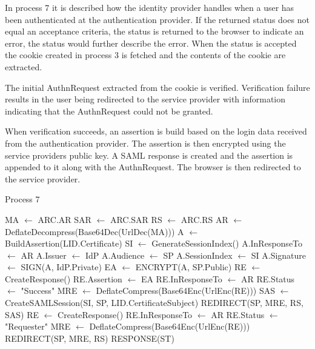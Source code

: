 \documentclass[twosided]{report}
\begin{document}
In process 7 it is described how the identity provider handles when a user has been authenticated at the authentication provider. If the returned status does not equal an acceptance criteria, the status is returned to the browser to indicate an error, the status would further describe the error. When the status is accepted the cookie created in process 3 is fetched and the contents of the cookie are extracted.
\par
The initial AuthnRequest extracted from the cookie is verified. Verification failure results in the user being redirected to the service provider with information indicating that the AuthnRequest could not be granted.
\par
When verification succeeds, an assertion is build based on the login data received from the authentication provider. The assertion is then encrypted using the service providers public key. A SAML response is created and the assertion is appended to it along with the AuthnRequest. The browser is then redirected to the service provider.
\begin{algorithm}[H]
	\caption{Process 7}
	\begin{algorithmic}
			\STATE MA $\leftarrow$ ARC.AR
			\STATE SAR $\leftarrow$ ARC.SAR
			\STATE RS $\leftarrow$ ARC.RS
			\STATE AR $\leftarrow$ DeflateDecompress(Base64Dec(UrlDec(MA)))
				\STATE A $\leftarrow$ BuildAssertion(LID.Certificate)
				\STATE SI $\leftarrow$ GenerateSessionIndex()
				\STATE A.InResponseTo $\leftarrow$ AR
				\STATE A.Issuer $\leftarrow$ IdP
				\STATE A.Audience $\leftarrow$ SP
				\STATE A.SessionIndex $\leftarrow$ SI
				\STATE A.Signature $\leftarrow$ SIGN(A, IdP.Private)
				\STATE EA $\leftarrow$ ENCRYPT(A, SP.Public)
				\STATE RE $\leftarrow$ CreateResponse()
				\STATE RE.Assertion $\leftarrow$ EA
				\STATE RE.InResponseTo $\leftarrow$ AR
				\STATE RE.Status $\leftarrow$ "Success"
				\STATE MRE $\leftarrow$ DeflateCompress(Base64Enc(UrlEnc(RE)))
				\STATE SAS $\leftarrow$ CreateSAMLSession(SI, SP, LID.CertificateSubject)
				\RETURN REDIRECT(SP, MRE, RS, SAS)
			\ELSE
				\STATE RE $\leftarrow$ CreateResponse()
				\STATE RE.InResponseTo $\leftarrow$ AR
				\STATE RE.Status $\leftarrow$ "Requester"
				\STATE MRE $\leftarrow$ DeflateCompress(Base64Enc(UrlEnc(RE)))
				\RETURN REDIRECT(SP, MRE, RS)
			\ENDIF	
		\ELSE
			\RETURN RESPONSE(ST)
		\ENDIF
	\end{algorithmic}
\end{algorithm}
\end{document}
